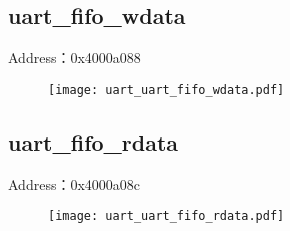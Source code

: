\subsection{uart\_fifo\_wdata}
\label{uart-uart-fifo-wdata}
Address：0x4000a088
 \begin{figure}[H]
\texttt{[image: uart\_uart\_fifo\_wdata.pdf]}
\end{figure}

\subsection{uart\_fifo\_rdata}
\label{uart-uart-fifo-rdata}
Address：0x4000a08c
 \begin{figure}[H]
\texttt{[image: uart\_uart\_fifo\_rdata.pdf]}
\end{figure}

